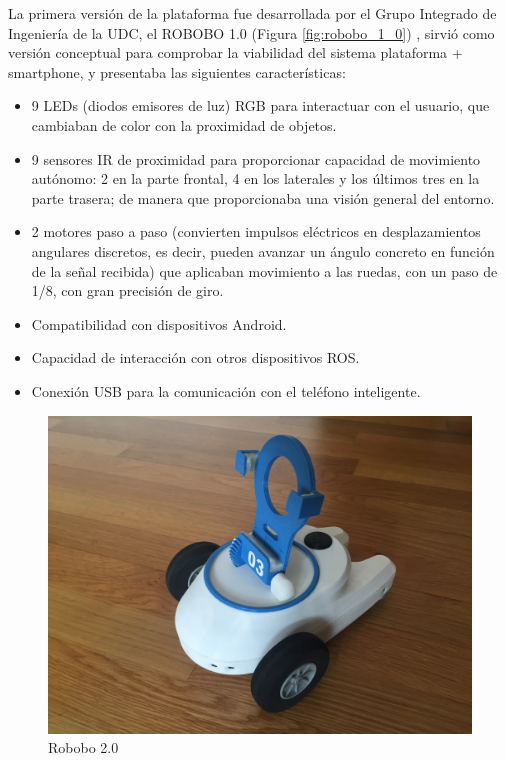 La primera versión de la plataforma fue desarrollada por el Grupo Integrado de Ingeniería de la UDC, el ROBOBO 1.0 (Figura \ref{fig:robobo_1_0}) , sirvió como versión conceptual para comprobar la viabilidad del sistema plataforma + smartphone, y presentaba las siguientes características:

\begin{itemize}

	\item 9 LEDs (diodos emisores de luz) RGB para interactuar con el usuario, que cambiaban de color con la proximidad de objetos.
	\item 9 sensores IR de proximidad para proporcionar capacidad de movimiento autónomo: 2 en la parte frontal, 4 en los laterales y los últimos tres en la parte trasera; de manera que proporcionaba una visión general del entorno.
	\item 2 motores paso a paso (convierten impulsos eléctricos en desplazamientos angulares discretos, es decir, pueden avanzar un ángulo concreto en función de la señal recibida) que aplicaban movimiento a las ruedas, con un paso de 1/8, con gran precisión de giro.
	\item Compatibilidad con dispositivos Android.
	\item Capacidad de interacción con otros dispositivos ROS.
	\item Conexión USB para la comunicación con el teléfono inteligente.

\end{itemize}


\begin{figure}
	\centering
	\includegraphics[width=0.8\linewidth]{imagenes/robobo_rob.JPG}
	\caption{Robobo 2.0}
	\label{fig:robobo_2_0}
\end{figure} 

